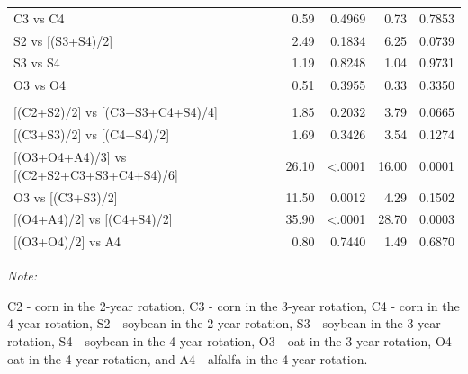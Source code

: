 \documentclass[
]{article}
\begin{document}
\begin{table}
\begin{threeparttable}
\begin{tabular}[t]{lrrrrrr}
\hspace{1em}\hspace{1em}C3 vs C4 &  &  & 0.59 & 0.4969 & 0.73 & 0.7853\\
 
\hspace{1em}\hspace{1em}S2 vs [(S3+S4)/2] &  &  & 2.49 & 0.1834 & 6.25 & 0.0739\\
 
\hspace{1em}\hspace{1em}S3 vs S4 &  &  & 1.19 & 0.8248 & 1.04 & 0.9731\\
 
\hspace{1em}\hspace{1em}O3 vs O4 &  &  & 0.51 & 0.3955 & 0.33 & 0.3350\\
 
\addlinespace[0.3em]
\multicolumn{7}{l}{\textbf{(B3) - Crop type effects}}\\
\hspace{1em}\hspace{1em}{}[(C2+S2)/2] vs [(C3+S3+C4+S4)/4] &  &  & 1.85 & 0.2032 & 3.79 & 0.0665\\
 
\hspace{1em}\hspace{1em}{}[(C3+S3)/2] vs [(C4+S4)/2] &  &  & 1.69 & 0.3426 & 3.54 & 0.1274\\
 
\hspace{1em}\hspace{1em}{}[(O3+O4+A4)/3] vs [(C2+S2+C3+S3+C4+S4)/6] &  &  & 26.10 & <.0001 & 16.00 & 0.0001\\
 
\hspace{1em}\hspace{1em}O3 vs [(C3+S3)/2] &  &  & 11.50 & 0.0012 & 4.29 & 0.1502\\
 
\hspace{1em}\hspace{1em}{}[(O4+A4)/2] vs [(C4+S4)/2] &  &  & 35.90 & <.0001 & 28.70 & 0.0003\\
 
\hspace{1em}\hspace{1em}{}[(O3+O4)/2] vs A4 &  &  & 0.80 & 0.7440 & 1.49 & 0.6870\\
\bottomrule
\end{tabular}
\begin{tablenotes}[para]
\item \textit{Note: } 
\item C2 - corn in the 2-year rotation, C3 - corn in the 3-year rotation, C4 - corn in the 4-year rotation, S2 - soybean in the 2-year rotation, S3 - soybean in the 3-year rotation, S4 - soybean in the 4-year rotation, O3 - oat in the 3-year rotation, O4 - oat in the 4-year rotation, and A4 - alfalfa in the 4-year rotation.
\end{tablenotes}
\end{threeparttable}
\end{table}
\end{document}
